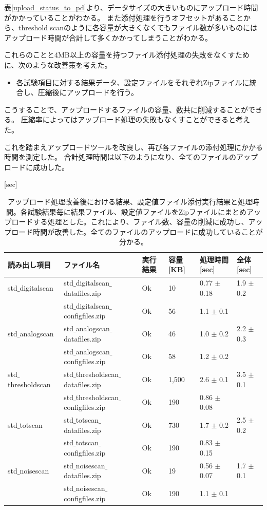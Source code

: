 \newpage
表\ref{upload_status_to_pd}より、データサイズの大きいものにアップロード時間がかかっていることがわかる。
また添付処理を行うオフセットがあることから、threshold scanのように各容量が大きくなくてもファイル数が多いものにはアップロード時間が合計して多くかかってしまうことがわかる。

これらのことと4MB以上の容量を持つファイル添付処理の失敗をなくすために、次のような改善策を考えた。

\begin{itemize}
  \item 各試験項目に対する結果データ、設定ファイルをそれぞれZipファイルに統合し、圧縮後にアップロードを行う。
\end{itemize}

こうすることで、アップロードするファイルの容量、数共に削減することができる。
圧縮率によってはアップロード処理の失敗もなくすことができると考えた。

これを踏まえアップロードツールを改良し、再び各ファイルの添付処理にかかる時間を測定した。
合計処理時間は以下のようになり、全てのファイルのアップロードに成功した。

  [{\rm sec}]
\eee

{\scriptsize
\begin{longtable}{|llllll|}
  \caption[アップロード処理改善後における結果、設定値ファイル添付実行結果と処理時間]{アップロード処理改善後における結果、設定値ファイル添付実行結果と処理時間。各試験結果毎に結果ファイル、設定値ファイルをZipファイルにまとめアップロードする処理とした。これにより、ファイル数、容量の削減に成功し、アップロード時間が改善した。全てのファイルのアップロードに成功していることが分かる。}
  \label{upload_status_to_pd_zip}
  \endhead
  \hline
  読み出し項目 & ファイル名 & 実行結果 & 容量[KB] & 処理時間[sec] & 全体[sec] \\ 
  \hline
 std$\_$digitalscan & std$\_$digitalscan$\_$datafiles.zip & Ok & 10 & 0.77 $\pm$ 0.18 & 1.9 $\pm$ 0.2\\
 & std$\_$digitalscan$\_$configfiles.zip & Ok & 56 & 1.1 $\pm$ 0.1 &\\
\hline
 std$\_$analogscan & std$\_$analogscan$\_$datafiles.zip & Ok & 46 & 1.0 $\pm$ 0.2 & 2.2 $\pm$ 0.3 \\
 & std$\_$analogscan$\_$configfiles.zip & Ok & 58 & 1.2 $\pm$ 0.2 &\\
\hline
 std$\_$thresholdscan & std$\_$thresholdscan$\_$datafiles.zip & Ok & 1,500 & 2.6 $\pm$ 0.1 & 3.5 $\pm$ 0.1 \\
 & std$\_$thresholdscan$\_$configfiles.zip & Ok & 190 & 0.86 $\pm$ 0.08 &\\
\hline
 std$\_$totscan & std$\_$totscan$\_$datafiles.zip & Ok & 730 & 1.7 $\pm$ 0.2 & 2.5 $\pm$ 0.2\\
 & std$\_$totscan$\_$configfiles.zip & Ok & 190 & 0.83 $\pm$ 0.15 &\\
\hline
 std$\_$noisescan & std$\_$noisescan$\_$datafiles.zip & Ok & 19 & 0.56 $\pm$ 0.07 & 1.7 $\pm$ 0.1 \\
 & std$\_$noisescan$\_$configfiles.zip & Ok & 190 & 1.1 $\pm$ 0.1 &\\
\hline
\end{longtable}
}

